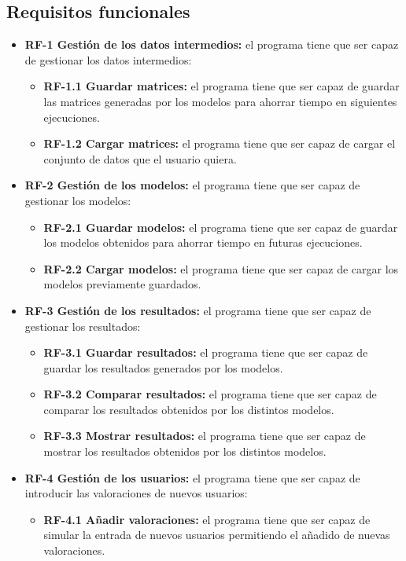 \subsection{Requisitos funcionales}
\begin{itemize}
\tightlist
\item \textbf{RF-1 Gestión de los datos intermedios:} el programa tiene que ser capaz de gestionar los datos intermedios:
\begin{itemize}
\tightlist
\item \textbf{RF-1.1 Guardar matrices:} el programa tiene que ser capaz de guardar las matrices generadas por los modelos para ahorrar tiempo en siguientes ejecuciones.
\item \textbf{RF-1.2 Cargar matrices:} el programa tiene que ser capaz de cargar el conjunto de datos que el usuario quiera.
\end{itemize}
\item \textbf{RF-2 Gestión de los modelos:} el programa tiene que ser capaz de gestionar los modelos:
\begin{itemize}
\tightlist
\item \textbf{RF-2.1 Guardar modelos:} el programa tiene que ser capaz de guardar los modelos obtenidos para ahorrar tiempo en futuras ejecuciones.
\item \textbf{RF-2.2 Cargar modelos:} el programa tiene que ser capaz de cargar los modelos previamente guardados.
\end{itemize}
\item \textbf{RF-3 Gestión de los resultados:} el programa tiene que ser capaz de gestionar los resultados:
\begin{itemize}
\tightlist
\item \textbf{RF-3.1 Guardar resultados:} el programa tiene que ser capaz de guardar los resultados generados por los modelos.
\item \textbf{RF-3.2 Comparar resultados:} el programa tiene que ser capaz de comparar los resultados obtenidos por los distintos modelos.
\item \textbf{RF-3.3 Mostrar resultados:} el programa tiene que ser capaz de mostrar los resultados obtenidos por los distintos modelos.
\end{itemize}
\item \textbf{RF-4 Gestión de los usuarios:} el programa tiene que ser capaz de introducir las valoraciones de nuevos usuarios:
\begin{itemize}
\tightlist
\item \textbf{RF-4.1 Añadir valoraciones:} el programa tiene que ser capaz de simular la entrada de nuevos usuarios permitiendo el añadido de nuevas valoraciones.

\end{itemize}
\end{itemize}

